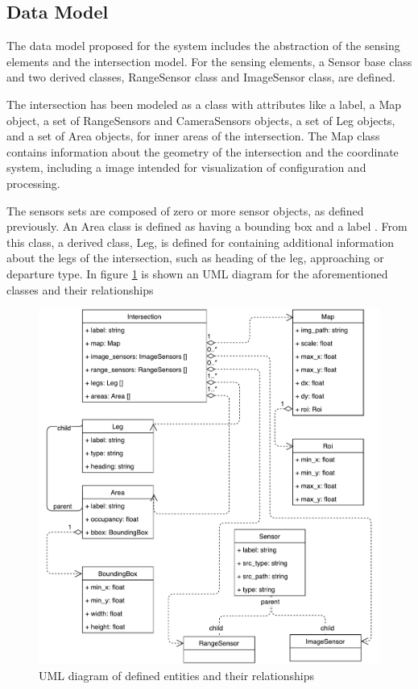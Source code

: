 \subsection{Data Model}

The data model proposed for the system includes the abstraction of the sensing elements and the intersection model. For the sensing elements, a Sensor base class and two derived classes, RangeSensor class and ImageSensor class, are defined. 

The intersection has been modeled as a class with attributes like a label, a Map object, a set of RangeSensors and CameraSensors objects, a set of Leg objects, and a set of Area objects, for inner areas of the intersection. The Map class contains information about the geometry of the intersection and the coordinate system, including a image intended for visualization of configuration and processing.

The sensors sets are composed of zero or more sensor objects, as defined previously. An Area class is defined as having a bounding box and a label	. From this class, a derived class, Leg, is defined for containing additional information about the legs of the intersection, such as heading of the leg, approaching or departure type. In figure \ref{data_model} is shown an UML diagram for the aforementioned classes and their relationships

\begin{figure}[ht!]
\centering
\includegraphics[scale=0.5]{fig/3/data_model.pdf}
\caption{UML diagram of defined entities and their relationships}
\label{data_model}
\end{figure}

